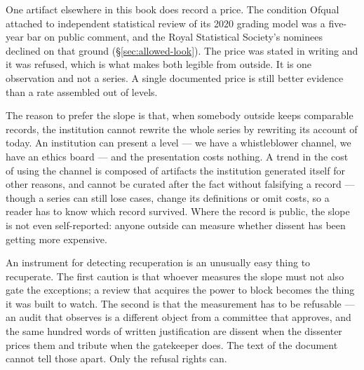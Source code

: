 One artifact elsewhere in this book does record a price. The condition Ofqual attached to independent statistical review of its 2020 grading model was a five-year bar on public comment, and the Royal Statistical Society's nominees declined on that ground (§\ref{sec:allowed-look}). The price was stated in writing and it was refused, which is what makes both legible from outside. It is one observation and not a series. A single documented price is still better evidence than a rate assembled out of levels.

The reason to prefer the slope is that, when somebody outside keeps comparable records, the institution cannot rewrite the whole series by rewriting its account of today. An institution can present a level — we have a whistleblower channel, we have an ethics board — and the presentation costs nothing. A trend in the cost of using the channel is composed of artifacts the institution generated itself for other reasons, and cannot be curated after the fact without falsifying a record — though a series can still lose cases, change its definitions or omit costs, so a reader has to know which record survived. Where the record is public, the slope is not even self-reported: anyone outside can measure whether dissent has been getting more expensive.

An instrument for detecting recuperation is an unusually easy thing to recuperate. The first caution is that whoever measures the slope must not also gate the exceptions; a review that acquires the power to block becomes the thing it was built to watch. The second is that the measurement has to be refusable — an audit that observes is a different object from a committee that approves, and the same hundred words of written justification are dissent when the dissenter prices them and tribute when the gatekeeper does. The text of the document cannot tell those apart. Only the refusal rights can.
